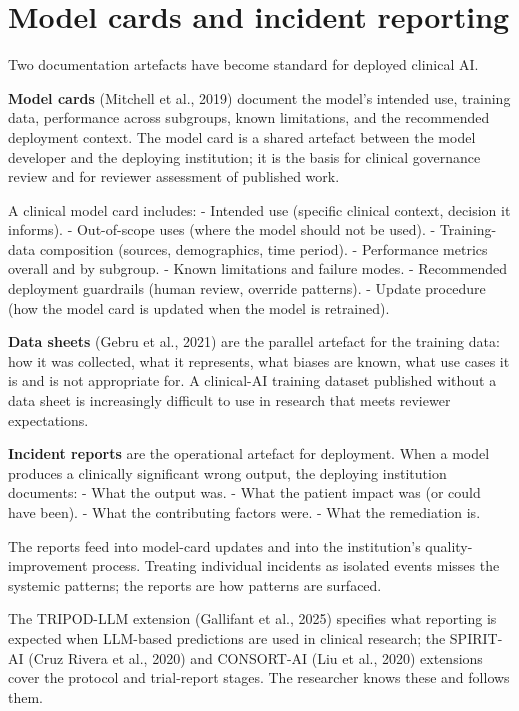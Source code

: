 \documentclass[
  letterpaper,
  11pt]{scrbook}
\begin{document}
\section{Model cards and incident
reporting}\label{model-cards-and-incident-reporting}

Two documentation artefacts have become standard for deployed clinical
AI.

\textbf{Model cards} (Mitchell et al., 2019) document the model's
intended use, training data, performance across subgroups, known
limitations, and the recommended deployment context. The model card is a
shared artefact between the model developer and the deploying
institution; it is the basis for clinical governance review and for
reviewer assessment of published work.

A clinical model card includes: - Intended use (specific clinical
context, decision it informs). - Out-of-scope uses (where the model
should not be used). - Training-data composition (sources, demographics,
time period). - Performance metrics overall and by subgroup. - Known
limitations and failure modes. - Recommended deployment guardrails
(human review, override patterns). - Update procedure (how the model
card is updated when the model is retrained).

\textbf{Data sheets} (Gebru et al., 2021) are the parallel artefact for
the training data: how it was collected, what it represents, what biases
are known, what use cases it is and is not appropriate for. A
clinical-AI training dataset published without a data sheet is
increasingly difficult to use in research that meets reviewer
expectations.

\textbf{Incident reports} are the operational artefact for deployment.
When a model produces a clinically significant wrong output, the
deploying institution documents: - What the output was. - What the
patient impact was (or could have been). - What the contributing factors
were. - What the remediation is.

The reports feed into model-card updates and into the institution's
quality-improvement process. Treating individual incidents as isolated
events misses the systemic patterns; the reports are how patterns are
surfaced.

The TRIPOD-LLM extension ({Gallifant et al.}, 2025) specifies what
reporting is expected when LLM-based predictions are used in clinical
research; the SPIRIT- AI (Cruz Rivera et al., 2020) and CONSORT-AI (Liu
et al., 2020) extensions cover the protocol and trial-report stages. The
researcher knows these and follows them.
\end{document}

